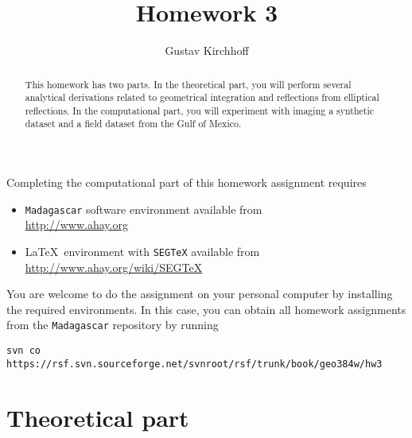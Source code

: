 \author{Gustav Kirchhoff} 
\title{Homework 3}

\begin{abstract}
  This homework has two parts. In the theoretical part, you will
  perform several analytical derivations related to 
  geometrical integration and reflections from elliptical reflections. In the
  computational part, you will experiment with imaging a synthetic
  dataset and a field dataset from the Gulf of Mexico.
\end{abstract}

Completing the computational part of this homework assignment requires
\begin{itemize}
\item \texttt{Madagascar} software environment available from \\
  \url{http://www.ahay.org}
\item \LaTeX\ environment with \texttt{SEGTeX} available from \\ 
  \url{http://www.ahay.org/wiki/SEGTeX}
\end{itemize}

You are welcome to do the assignment on your personal computer by
installing the required environments. In this case, you can obtain all
homework assignments from the \texttt{Madagascar} repository by running
\begin{verbatim}
svn co https://rsf.svn.sourceforge.net/svnroot/rsf/trunk/book/geo384w/hw3 
\end{verbatim}

\section{Theoretical part}

